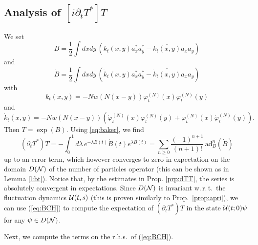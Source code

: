 \documentclass[11pt,a4paper]{article}
\newcommand{\done}{}
\newcommand{\cU}{{\cal U}}
\newcommand{\cN}{{\cal N}}
\newcommand{\ad}{\operatorname{ad}}	%
\newcommand{\di}{{d}}		%
\begin{document}
\subsection{Analysis of $[i \partial_t T^*] T$}

We set 
\[ B = \frac{1}{2} \int dx dy \, \left( k_t (x,y) a_x^* a_y^* - \overline{k_t (x,y)} a_x a_y \right) \]
and 
\[ \dot{B} =  \frac{1}{2} \int dx dy \, \left( \dot{k}_t (x,y) a_x^* a_y^* - \overline{\dot{k}_t (x,y)} a_x a_y \right) \]
with 
\[ k_t (x,y) = -N w(N(x-y)) \varphi_t^{(N)} (x) \varphi_t^{(N)} (y) \]
and
\[ \dot{k}_t (x,y) = - N w (N (x-y))  \left( \dot{\varphi}_t^{(N)} (x) \varphi_t^{(N)} (y) + \varphi_t^{(N)} (x) \dot{\varphi}_t^{(N)} (y) \right). \]
Then $T = \exp (B)$. Using \eqref{eq:baker}, we find%
\begin{equation}\label{eq:BCH} \left(\partial_t T^* \right) T = -\int_0^1 \di\lambda\, e^{-\lambda B(t)} \dot B(t) e^{\lambda B(t)} = \sum_{n \geq 0} \frac{(-1)^{n+1}}{(n+1)!}\,  \text{ad}^n_{B} (\dot{B}) \end{equation}
up to an error term, which however converges to zero in expectation on the
domain $D(\cN)$ of the number of particles operator (this can be shown as in
Lemma \ref{l:bt}). Notice that, by the estimates in Prop. \ref{prp:dTT}, the series is absolutely convergent in expectations. Since $D(\cN)$ is invariant w.\,r.\,t.\ the fluctuation dynamics $\cU (t,s)$ (this is proven similarly to Prop.\ \ref{prop:apri})\done{}, we can use (\ref{eq:BCH}) to compute the expectation of $(\partial_t T^*) T$ in the state $\cU (t;0) \psi$ for any $\psi \in D(\cN)$. 

Next, we compute the terms on the r.h.s.\ of (\ref{eq:BCH}).
\end{document}
